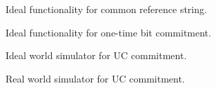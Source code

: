 \begin{figure}

\caption{Ideal functionality for common reference string.}
\label{fig:f-crs}
\end{figure}

\begin{figure}

\caption{Ideal functionality for one-time bit commitment.}
\label{fig:f-com-full}
\end{figure}

\begin{figure}

\caption{Ideal world simulator for UC commitment.}
\label{fig:sim}
\end{figure}

\begin{figure}

\caption{Real world simulator for UC commitment.}
\label{fig:simR}
\end{figure}
